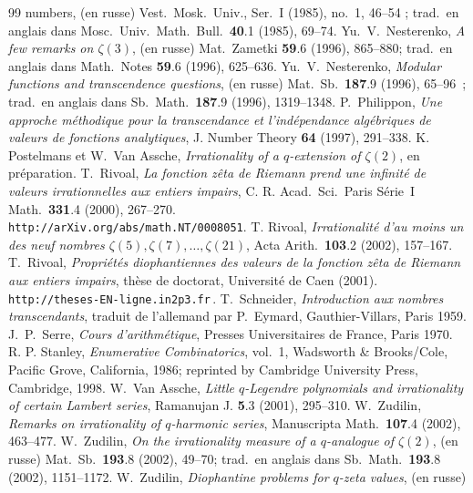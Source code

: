 \documentclass[12pt]{amsart}
\theoremstyle{remark}
\numberwithin{equation}{section}
\begin{document}
\begin{thebibliography}{99}
{numbers}, (en russe) Vest.\ Mosk.\ Univ., Ser.~I (1985), no.~1,  46--54 ;
trad.\ en anglais dans Mosc.\ Univ.\ Math.\ Bull.\ \textbf{40}.1 (1985), 
69--74.
 Yu.~V.~Nesterenko, {\em A few remarks on
$\zeta(3)$}, (en russe) Mat.\ Zametki {\bf 59}.6 (1996), 865--880;
trad.\ en anglais dans Math.\ Notes
{\bf 59}.6 (1996), 625--636.
 Yu.~V.~Nesterenko, {\it
Modular functions and transcendence questions}, (en russe) 
Mat.\ Sb.\ {\bf 187}.9 (1996), 65--96~; trad.\ en anglais dans Sb.\ Math.\ 
{\bf 187}.9 (1996),  1319--1348.
 P.~Philippon, {\it Une approche m{\'e}thodique pour la transcendance et l'ind{\'e}pendance 
alg{\'e}briques de valeurs de fonctions analytiques}, J. Number Theory {\bf 64} (1997), 291--338.
\bibitem{postvan} K. Postelmans et W.~Van Assche,
{\em Irrationality of a $q$-extension of $\zeta(2)$}, en pr{\'e}paration.
\bibitem{ri} T.~Rivoal, {\em La fonction z{\^e}ta de
Riemann prend 
une infinit{\'e} de valeurs 
irrationnelles aux entiers impairs}, C.
R. Acad.\ Sci.\ Paris S{\'e}rie~I Math.\ {\bf 331}.4 (2000), 267--270.\\
{\tt http\!\!\!://arXiv.org/abs/math.NT/0008051}.
 T. Rivoal,
{\em Irrationalit{\'e} d'au moins un des neuf nombres $\zeta(5),
\zeta(7), \dots, \zeta(21)$}, Acta Arith.\ \textbf{103}.2 (2002),
157--167.
 T.~Rivoal, {\it Propri{\'e}t{\'e}s diophantiennes
des valeurs de la fonction z{\^e}ta de Riemann aux entiers impairs},
th{\`e}se de doctorat, Universit{\'e} de Caen (2001).
{\tt http\!\!\!://theses-EN-ligne.in2p3.fr}\,.
 T.~Schneider, {\it Introduction aux nombres
    transcendants}, 
traduit de l'allemand par P.~Eymard,  
Gauthier-Villars, Paris 1959.
 J.~P.~Serre, {\it Cours d'arithm{\'e}tique}, 
Presses Universitaires de France, Paris 1970.
R. P. Stanley, {\em Enumerative
Combinatorics}, vol.~1, Wadsworth \& Brooks/Cole,
Pacific Grove, California, 1986; reprinted by Cambridge University
Press, Cambridge, 1998.
 W.~Van Assche,
{\em Little $q$-Legendre polynomials and irrationality of certain
Lambert series},
Ramanujan J. {\bf 5}.3 (2001), 295--310.
 W.~Zudilin, {\it Remarks on irrationality of
    $q$-harmonic series},  
Manuscripta Math.\ {\bf 107}.4 (2002),  463--477.
 W.~Zudilin, {\it On the irrationality measure of a 
    $q$-analogue of $\zeta(2)$}, (en russe) 
Mat.\ Sb.\  {\bf 193}.8 (2002),  49--70; trad.\ en anglais dans Sb.\ Math.\ 
{\bf 193}.8 (2002), 1151--1172.
\bibitem{zud5} W.~Zudilin,
{\it Diophantine problems for $q$-zeta values}, (en russe)

\end{thebibliography}
\end{document}

